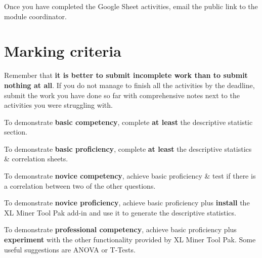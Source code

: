 \documentclass{../../../fal_assignment}
\begin{document}
Once you have completed the Google Sheet activities, email the public link to the module coordinator. 

\section*{Marking criteria}

Remember that \textbf{it is better to submit incomplete work than to submit nothing at all}. If you do not manage to finish all the activities by the deadline, submit the work you have done so far with comprehensive notes next to the activities you were struggling with. 

To demonstrate \textbf{basic competency}, complete \textbf{at least} the descriptive statistic section.

To demonstrate \textbf{basic proficiency}, complete \textbf{at least} the descriptive statistics \& correlation sheets.

To demonstrate \textbf{novice competency}, achieve basic proficiency \& test if there is a correlation between two of the other questions.
	
To demonstrate \textbf{novice proficiency}, achieve basic proficiency plus \textbf{install} the XL Miner Tool Pak add-in and use it to generate the descriptive statistics. 

To demonstrate \textbf{professional competency}, achieve basic proficiency plus \textbf{experiment} with the other functionality provided by XL Miner Tool Pak. Some useful suggestions are ANOVA or T-Tests. 
\end{document}

